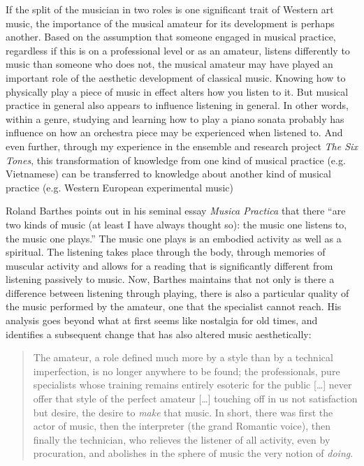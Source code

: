 \documentclass[11pt]{article}
\begin{document}
If the split of the musician in two roles is one significant trait of Western art music, the importance of the musical amateur for its development is perhaps another. Based on the assumption that someone engaged in musical practice, regardless if this is on a professional level or as an amateur, listens differently to music than someone who does not, the musical amateur may have played an important role of the aesthetic development of classical music. Knowing how to physically play a piece of music in effect alters how you listen to it. But musical practice in general also appears to influence listening in general. In other words, within a genre, studying and learning how to play a piano sonata probably has influence on how an orchestra piece may be experienced when listened to. And even further, through my experience in the ensemble and research project \emph{The Six Tones}, this transformation of knowledge from one kind of musical practice (e.g. Vietnamese) can be transferred to knowledge about another kind of musical practice (e.g. Western European experimental music) \cite{frisk12-improv, frisk2013}

Roland Barthes points out in his seminal essay \emph{Musica Practica} that there ``are two kinds of music (at least I have always thought so): the music one listens to, the music one plays.'' \citep[p.149]{barthes77} The music one plays is an embodied activity as well as a spiritual. The listening takes place through the body, through memories of muscular activity and allows for a reading that is significantly different from listening passively to music. 
Now, Barthes maintains that not only is there a difference between listening through playing, there is also a particular quality of the music performed by the amateur, one that the specialist cannot reach. His analysis goes beyond what at first seems like nostalgia for old times, and identifies a subsequent change that has also altered music aesthetically:

\begin{quote}
  The amateur, a role defined much more by a style than by a technical imperfection, is no longer anywhere to be found; the professionals, pure specialists whose training remains entirely esoteric for the public [\ldots] never offer that style of the perfect amateur [\ldots] touching off in us not satisfaction but desire, the desire to \emph{make} that music. In short, there was first the actor of music, then the interpreter (the grand Romantic voice), then finally the technician, who relieves the listener of all activity, even by procuration, and abolishes in the sphere of music the very notion of \emph{doing}. \citep[p.150]{barthes77}
\end{quote}
\end{document}
